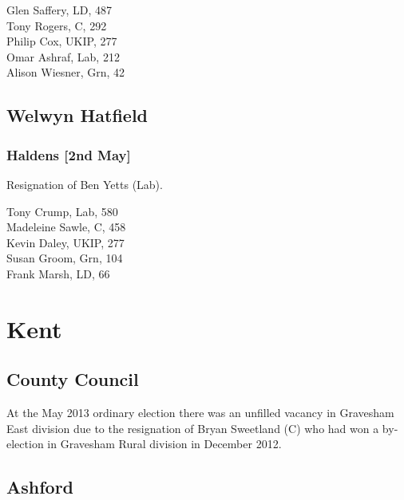 \documentclass[a4paper,openany,10pt]{book}
\begin{document}
Glen Saffery, LD, 487\\
Tony Rogers, C, 292\\
Philip Cox, UKIP, 277\\
Omar Ashraf, Lab, 212\\
Alison Wiesner, Grn, 42\\


\subsection*{Welwyn Hatfield}

\subsubsection*{Haldens \hspace*{\fill}\nolinebreak[1]%
\enspace\hspace*{\fill}
[2nd May]}


Resignation of Ben Yetts (Lab).



Tony Crump, Lab, 580\\
Madeleine Sawle, C, 458\\
Kevin Daley, UKIP, 277\\
Susan Groom, Grn, 104\\
Frank Marsh, LD, 66\\


\vfill

\section{Kent}

\subsection*{County Council}

At the May 2013 ordinary election there was an unfilled vacancy in Gravesham East division due to the resignation of Bryan Sweetland (C) who had won a by-election in Gravesham Rural division in December 2012.




\subsection*{Ashford}
\end{document}
